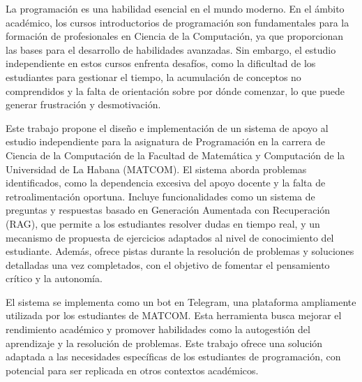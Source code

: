 \begin{resumen}
	La programación es una habilidad esencial en el mundo moderno. En el ámbito académico, los cursos introductorios de programación son fundamentales para la formación de profesionales en Ciencia de la Computación, ya que proporcionan las bases para el desarrollo de habilidades avanzadas. Sin embargo, el estudio independiente en estos cursos enfrenta desafíos, como la dificultad de los estudiantes para gestionar el tiempo, la acumulación de conceptos no comprendidos y la falta de orientación sobre por dónde comenzar, lo que puede generar frustración y desmotivación.

	Este trabajo propone el diseño e implementación de un sistema de apoyo al estudio independiente para la asignatura de Programación en la carrera de Ciencia de la Computación de la Facultad de Matemática y Computación de la Universidad de La Habana (\mbox{MATCOM}). El sistema aborda problemas identificados, como la dependencia excesiva del apoyo docente y la falta de retroalimentación oportuna. Incluye funcionalidades como un sistema de preguntas y respuestas basado en Generación Aumentada con Recuperación (RAG), que permite a los estudiantes resolver dudas en tiempo real, y un mecanismo de propuesta de ejercicios adaptados al nivel de conocimiento del estudiante. Además, ofrece pistas durante la resolución de problemas y soluciones detalladas una vez completados, con el objetivo de fomentar el pensamiento crítico y la autonomía.

	El sistema se implementa como un bot en Telegram, una plataforma ampliamente utilizada por los estudiantes de \mbox{MATCOM}. Esta herramienta busca mejorar el rendimiento académico y promover habilidades como la autogestión del aprendizaje y la resolución de problemas. Este trabajo ofrece una solución adaptada a las necesidades específicas de los estudiantes de programación, con potencial para ser replicada en otros contextos académicos.
\end{resumen}


